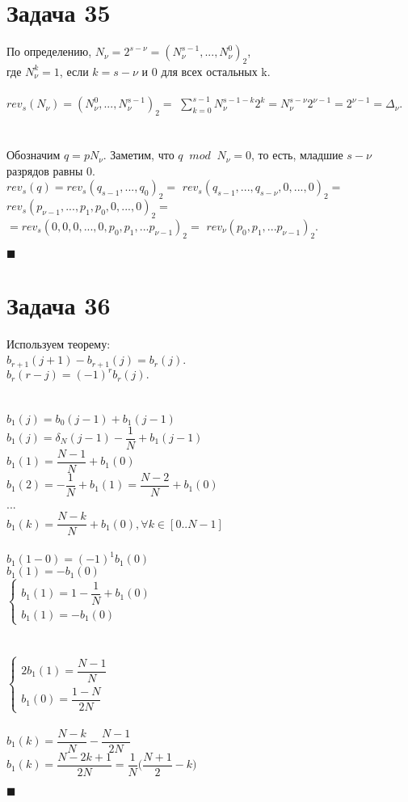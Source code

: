 \documentclass{article}
\newcommand\proofend{\begin{flushright}$\blacksquare$\end{flushright}}
\begin{document}
{\section*{Задача 35}
По определению, $N_\nu = 2^{s-\nu} = (N_\nu^{s - 1}, ..., N_\nu^{0})_2$, \\где $N_\nu^k = 1$, если $k = s-\nu$ и $0$ для всех остальных k. \\ \\
$rev_s(N_\nu) = (N_\nu^{0}, ..., N_\nu^{s-1})_2 =$
$\sum\limits_{k=0}^{s-1} N_\nu^{s - 1 - k}2^k = N_\nu^{s - \nu}2^{\nu - 1} = 2^{\nu - 1} = \Delta_\nu$. \\ \\ \\
Обозначим $q = pN_\nu$. Заметим, что $q\;\;mod\;\;N_\nu = 0$, то есть, младшие $s - \nu$ разрядов равны 0.\\
$rev_s(q) = rev_s (q_{s-1}, ..., q_{0})_2 =$
$rev_s(q_{s-1},...,q_{s-\nu}, 0, ..., 0)_2 = $
$rev_s(p_{\nu-1},...,p_1,p_0,0,...,0)_2 = $\\
$=rev_s(0, 0, 0, ..., 0, p_0, p_1, ... p_{\nu-1})_2 =$
$rev_\nu(p_0, p_1, ... p_{\nu-1})_2$.
\proofend
\pagebreak
\section*{Задача 36}

Используем теорему:\\
$b_{r+1}(j+1) - b_{r+1}(j) = b_r(j)$.\\
$b_r(r - j) = (-1)^rb_r(j).$\\ \\ \\
$b_1(j) = b_0(j - 1) + b_1(j - 1)$\\
$b_1(j) = \delta_N(j - 1) - \dfrac{1}{N} + b_1(j - 1)$\\
$b_1(1) = \dfrac{N - 1}{N} + b_1(0)$\\
$b_1(2) = -\dfrac{1}{N} + b_1(1) = \dfrac{N - 2}{N} + b_1(0)$\\
...\\
$b_1(k) = \dfrac{N - k}{N} + b_1(0), \forall k \in [0..N-1]$\\ \\
$b_1(1 - 0) = (-1)^1b_1(0)$\\
$b_1(1) = -b_1(0)$\\

$
\left\{\begin{matrix}
	b_1(1) = 1 - \dfrac{1}{N} + b_1(0) \\
	b_1(1) = -b_1(0)
\end{matrix}\right.
$\\ \\ \\

$
\left\{\begin{matrix}
	2b_1(1) = \dfrac{N - 1}{N} \\
	b_1(0) = \dfrac{1 - N}{2N}
\end{matrix}\right.
$ \\ \\

$b_1(k) = \dfrac{N - k}{N} - \dfrac{N - 1}{2N}$\\
$b_1(k) = \dfrac{N - 2k + 1}{2N} = \dfrac{1}{N}\Bigg ( \dfrac{N + 1}{2} - k\Bigg )$\\

\proofend

}
\end{document}
